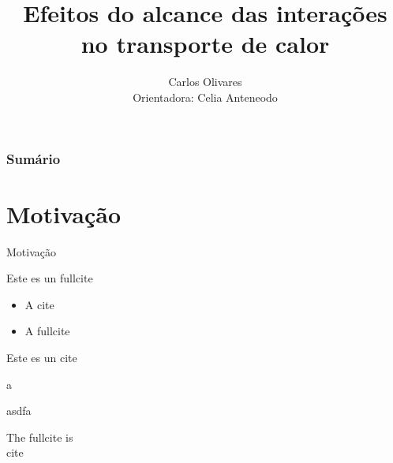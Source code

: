 \documentclass[8pt]{beamer}
\title{Efeitos do alcance das interações no transporte de calor}
\author{Carlos Olivares\\
Orientadora: Celia Anteneodo
}
\begin{document}
\maketitle

\begin{frame}
  \frametitle{Sumário}
  \small
  \tableofcontents %
  \normalsize
\end{frame}

\section{Motivação}

\begin{frame}{ Motivação }

Este es un fullcite~\cite{Antoni1995}


\begin{itemize}
 \item A cite~\cite{Antoni1995}
 \item A fullcite~
\end{itemize}


\end{frame}
%
%
%


\begin{frame}{  }



Este es un cite~\cite{DasDhar2014arXiv}

\end{frame}
%
%
%


\begin{frame}{  }
a
\end{frame}
%
%
%

\begin{frame}{  }
asdfa 
\end{frame}
%
%
%



\begin{frame}{  }

The fullcite is  \\

cite~\cite{DasDhar2014arXiv}

\cite{Dhar2001PRL}

\end{frame}
%
%
%
\end{document}
